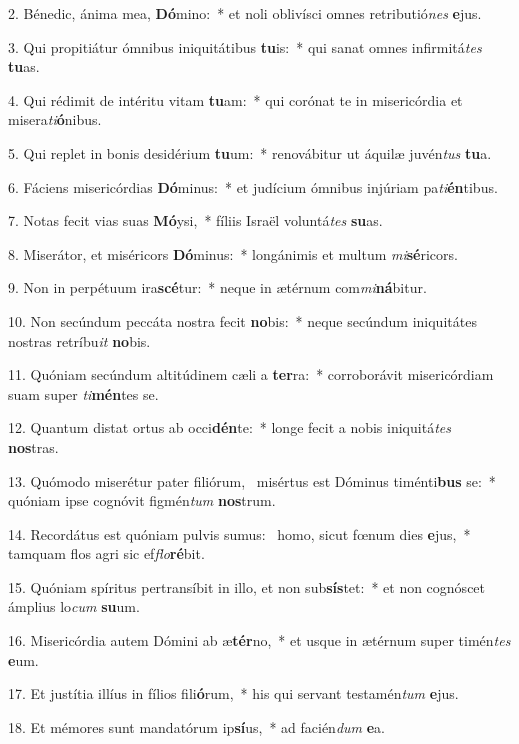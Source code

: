 2. Bénedic, ánima mea, \textbf{Dó}mino:~*  et noli oblivísci omnes retributió\textit{nes} \textbf{e}jus.\

3. Qui propitiátur ómnibus iniquitátibus \textbf{tu}is:~*  qui sanat omnes infirmitá\textit{tes} \textbf{tu}as.\

4. Qui rédimit de intéritu vitam \textbf{tu}am:~*  qui corónat te in misericórdia et misera\textit{ti}\textbf{ó}nibus.\

5. Qui replet in bonis desidérium \textbf{tu}um:~*  renovábitur ut áquilæ juvén\textit{tus} \textbf{tu}a.\

6. Fáciens misericórdias \textbf{Dó}minus:~*  et judícium ómnibus injúriam pa\textit{ti}\textbf{én}tibus.\

7. Notas fecit vias suas \textbf{Mó}ysi,~*  fíliis Israël voluntá\textit{tes} \textbf{su}as.\

8. Miserátor, et miséricors \textbf{Dó}minus:~*  longánimis et multum \textit{mi}\textbf{sé}ricors.\

9. Non in perpétuum ira\textbf{scé}tur:~*  neque in ætérnum com\textit{mi}\textbf{ná}bitur.\

10. Non secúndum peccáta nostra fecit \textbf{no}bis:~*  neque secúndum iniquitátes nostras retríbu\textit{it} \textbf{no}bis.\

11. Quóniam secúndum altitúdinem cæli a \textbf{ter}ra:~*  corroborávit misericórdiam suam super \textit{ti}\textbf{mén}tes se.\

12. Quantum distat ortus ab occi\textbf{dén}te:~*  longe fecit a nobis iniquitá\textit{tes} \textbf{nos}tras.\

13. Quómodo miserétur pater filiórum, \dag\  misértus est Dóminus timénti\textbf{bus} se:~*  quóniam ipse cognóvit figmén\textit{tum} \textbf{nos}trum.\

14. Recordátus est quóniam pulvis sumus: \dag\  homo, sicut fœnum dies \textbf{e}jus,~*  tamquam flos agri sic ef\textit{flo}\textbf{ré}bit.\

15. Quóniam spíritus pertransíbit in illo, et non sub\textbf{sís}tet:~*  et non cognóscet ámplius lo\textit{cum} \textbf{su}um.\

16. Misericórdia autem Dómini ab æ\textbf{tér}no,~*  et usque in ætérnum super timén\textit{tes} \textbf{e}um.\

17. Et justítia illíus in fílios fili\textbf{ó}rum,~*  his qui servant testamén\textit{tum} \textbf{e}jus.\

18. Et mémores sunt mandatórum ip\textbf{sí}us,~*  ad facién\textit{dum} \textbf{e}a.\

